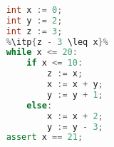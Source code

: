 \begin{lstlisting}[language=C++,basicstyle=\ttfamily,keywordstyle=\color{blue}, escapechar=\%]  % Start your code-block
	
	int x := 0;
	int y := 2;
	int z := 3;
	%\itp{z - 3 \leq x}%
	while x <= 20:
		if x <= 10:
			z := x;
			x := x + y;
			y := y + 1;
		else:
			x := x + 2;
			y := y - 3;
	assert x == 21;
	\end{lstlisting}